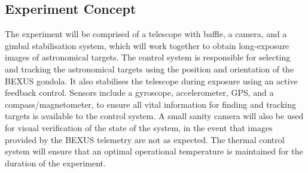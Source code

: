 \subsection{Experiment Concept}

The experiment will be comprised of a telescope with baffle, a camera, and a gimbal stabilisation system, which will work together to obtain long-exposure images of astronomical targets. The control system is responsible for selecting and tracking the astronomical targets using the position and orientation of the BEXUS gondola. It also stabilises the telescope during exposure using an active feedback control. Sensors include a gyroscope, accelerometer, GPS, and a compass/magnetometer, to ensure all vital information for finding and tracking targets is available to the control system. A small sanity camera will also be used for visual verification of the state of the system, in the event that images provided by the BEXUS telemetry are not as expected. The thermal control system will ensure that an optimal operational temperature is maintained for the duration of the experiment. 
